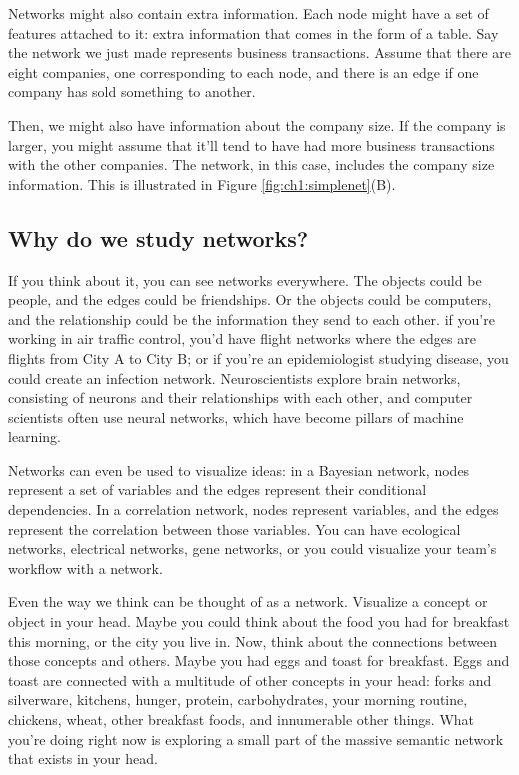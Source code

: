 Networks might also contain extra information. Each node might have a set of features attached to it: extra information that comes in the form of a table. Say the network we just made represents business transactions. Assume that there are eight companies, one corresponding to each node, and there is an edge if one company has sold something to another.

Then, we might also have information about the company size. If the company is larger, you might assume that it'll tend to have had more business transactions with the other companies. The network, in this case, includes the company size information. This is illustrated in Figure \ref{fig:ch1:simplenet}(B).

\subsection{Why do we study networks?}
\label{sec:ch1:howstudy}

If you think about it, you can see networks everywhere. The objects could be people, and the edges could be friendships. Or the objects could be computers, and the relationship could be the information they send to each other. if you're working in air traffic control, you'd have flight networks where the edges are flights from City A to City B; or if you're an epidemiologist studying disease, you could create an infection network. Neuroscientists explore brain networks, consisting of neurons and their relationships with each other, and computer scientists often use neural networks, which have become pillars of machine learning.

Networks can even be used to visualize ideas: in a Bayesian network, nodes represent a set of variables and the edges represent their conditional dependencies. In a correlation network, nodes represent variables, and the edges represent the correlation between those variables. You can have ecological networks, electrical networks, gene networks, or you could visualize your team's workflow with a network.

Even the way we think can be thought of as a network. Visualize a concept or object in your head. Maybe you could think about the food you had for breakfast this morning, or the city you live in. Now, think about the connections between those concepts and others. Maybe you had eggs and toast for breakfast. Eggs and toast are connected with a multitude of other concepts in your head: forks and silverware, kitchens, hunger, protein, carbohydrates, your morning routine, chickens, wheat, other breakfast foods, and innumerable other things. What you're doing right now is exploring a small part of the massive semantic network that exists in your head.

